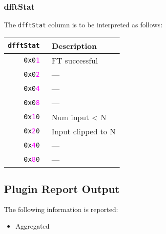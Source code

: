 \documentclass[documentation]{subfiles}
\begin{document}
\subsubsection{dfftStat}\label{dfftStat}
The {\tt dfftStat} column is to be interpreted as follows:
\begin{longtable}{>{\tt}rl}
    \toprule
    {\bf dfftStat} & {\bf Description}\\
    \midrule\endhead%
    0x0\textcolor{magenta}{1} & FT successful\\
    0x0\textcolor{magenta}{2} & ---\\
    0x0\textcolor{magenta}{4} & ---\\
    0x0\textcolor{magenta}{8} & ---\\
    0x\textcolor{magenta}{1}0 & Num input < N\\
    0x\textcolor{magenta}{2}0 & Input clipped to N\\
    0x\textcolor{magenta}{4}0 & ---\\
    0x\textcolor{magenta}{8}0 & ---\\
    \bottomrule
\end{longtable}

\subsection{Plugin Report Output}
The following information is reported:
\begin{itemize}
    \item Aggregated {\tt{}}
\end{itemize}
\end{document}
